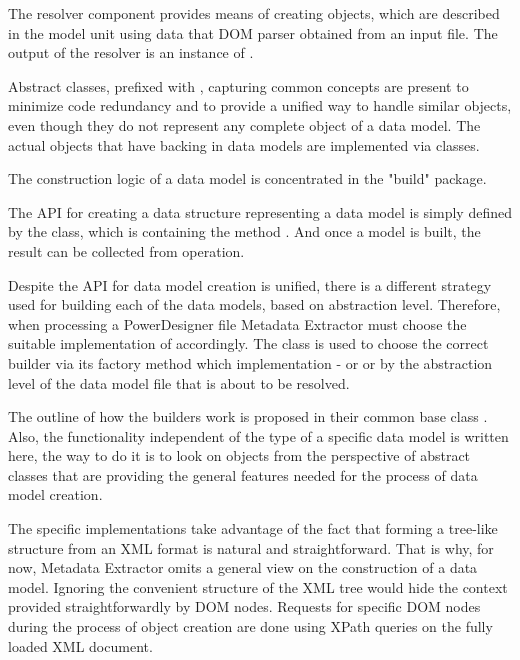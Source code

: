The resolver component provides means of creating objects, which are described in the model unit using data that DOM parser obtained from an input file. The output of the resolver is an instance of .

Abstract classes, prefixed with , capturing common concepts are present to minimize code redundancy and to provide a unified way to handle similar objects, even though they do not represent any complete object of a data model. 
The actual objects that have backing in data models are implemented via  classes.

The construction logic of a data model is concentrated in the "build" package.

The API for creating a data structure representing a data model is simply defined by the   class, which is containing the method . And once a model is built, the result can be collected from  operation.

Despite the API for data model creation is unified, there is a different strategy used for building each of the data models, based on abstraction level. 
Therefore, when processing a PowerDesigner file Metadata Extractor must choose the suitable implementation of  accordingly. 
The class  is used to choose the correct builder via its factory method which implementation -  or  or  by the abstraction level of the data model file that is about to be resolved.

The outline of how the builders work is proposed in their common base class . 
Also, the functionality independent of the type of a specific data model is written here, the way to do it is to look on objects from the perspective of abstract classes that are providing the general features needed for the process of data model creation.

The specific implementations take advantage of the fact that forming a tree-like structure from an XML format is natural and straightforward. That is why, for now, Metadata Extractor omits a general view on the construction of a data model. Ignoring the convenient structure of the XML tree would hide the context provided straightforwardly by DOM nodes. 
Requests for specific DOM nodes during the process of object creation are done using XPath queries on the fully loaded XML document.

